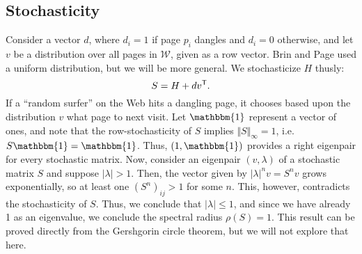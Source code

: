 \documentclass[../exploring-pagerank.tex]{subfiles}
\begin{document}
	\subsection{Stochasticity}
	 Consider a vector $d$, where $d_i=1$ if page $p_i$ dangles and $d_i=0$ otherwise, and let $v$ be a distribution over all pages in $\mathcal{W}$, given as a row vector. Brin and Page used a uniform distribution, but we will be more general. We stochasticize $H$ thusly:
	\begin{equation}
	    \label{eqn:S}
		S=H + dv^{\mathsf{T}}.
	\end{equation}
	 If a ``random surfer'' on the Web hits a dangling page, it chooses based upon the distribution $v$ what page to next visit. Let $\mathbbm{1}$ represent a vector of ones, and note that the row-stochasticity of $S$ implies $\Vert S \Vert_{\infty} = 1$, i.e. $S \mathbbm{1} = \mathbbm{1}$. Thus, $(1, \mathbbm{1})$ provides a right eigenpair for every stochastic matrix. Now, consider an eigenpair $(v, \lambda)$ of a stochastic matrix $S$ and suppose $|\lambda| > 1$. Then, the vector given by $|\lambda|^n v = S^n v$ grows exponentially, so at least one $(S^n)_{ij} > 1$ for some $n$. This, however, contradicts the stochasticity of $S$. Thus, we conclude that $|\lambda| \leq 1$, and since we have already 1 as an eigenvalue, we conclude the spectral radius $\rho(S)=1$. This result can be proved directly from the Gershgorin circle theorem, but we will not explore that here.
	 
\end{document}
